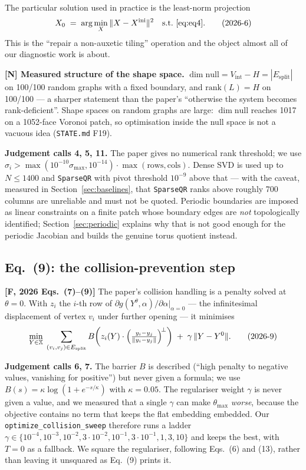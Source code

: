 \documentclass[11pt,a4paper]{article}
\theoremstyle{definition}
\newcommand{\Esplit}{E_{\mathrm{split}}}
\newcommand{\file}[1]{\texttt{\small #1}}
\begin{document}
The particular solution used in practice is the least-norm projection
\begin{equation}
X_0 \;=\; \arg\min_X \|X-X^{\mathrm{ini}}\|^2 \quad\text{s.t.\ \eqref{eq:eq4}} .
\tag{2026-6}
\label{eq:eq6}
\end{equation}
This is the ``repair a non-auxetic tiling'' operation and the object almost all of our
diagnostic work is about.

\textbf{[N] Measured structure of the shape space.} $\dim\mathrm{null} = V_{\mathrm{int}}-H
= |\Esplit|$ on 100/100 random graphs with a fixed boundary, and $\mathrm{rank}(L)=H$ on
100/100 --- a sharper statement than the paper's ``otherwise the system becomes
rank-deficient''. Shape spaces on random graphs are large: $\dim\mathrm{null}$ reaches 1017
on a 1052-face Voronoi patch, so optimisation inside the null space is not a vacuous idea
(\file{STATE.md} F19).

\textbf{Judgement calls 4, 5, 11.} The paper gives no numerical rank threshold; we use
$\sigma_i > \max(10^{-10}\sigma_{\max},10^{-14})\cdot\max(\text{rows},\text{cols})$. Dense
SVD is used up to $N\le1400$ and \file{SparseQR} with pivot threshold $10^{-9}$ above that
--- with the caveat, measured in Section~\ref{sec:baselines}, that \file{SparseQR} ranks
above roughly 700 columns are unreliable and must not be quoted. Periodic boundaries are
imposed as linear constraints on a finite patch whose boundary edges are \emph{not}
topologically identified; Section~\ref{sec:periodic} explains why that is not good enough
for the periodic Jacobian and builds the genuine torus quotient instead.

\subsection{Eq.~(9): the collision-prevention step}

\textbf{[F, 2026 Eqs.~(7)--(9)]} The paper's collision handling is a penalty solved at
$\theta=0$. With $z_i$ the $i$-th row of $\partial g(Y^\theta,\alpha)/\partial\alpha|_{\alpha=0}$
--- the infinitesimal displacement of vertex $v_i$ under further opening --- it minimises
\begin{equation}
\min_{Y\in\mathbb{X}} \;\sum_{(v_i,v_j)\in\Esplit}
B\!\left( z_i(Y)\cdot\Bigl(\tfrac{y_i-y_j}{\|y_i-y_j\|}\Bigr)^{\!\perp}\right)
\;+\;\gamma\,\|Y-Y^0\| .
\tag{2026-9}
\label{eq:eq9}
\end{equation}

\textbf{Judgement calls 6, 7.} The barrier $B$ is described (``high penalty to negative
values, vanishing for positive'') but never given a formula; we use
$B(s)=\kappa\log(1+e^{-s/\kappa})$ with $\kappa=0.05$. The regulariser weight $\gamma$ is
never given a value, and we measured that a single $\gamma$ can make $\theta_{\max}$
\emph{worse}, because the objective contains no term that keeps the flat embedding embedded.
Our \file{optimize\_collision\_sweep} therefore runs a ladder
$\gamma\in\{10^{-4},10^{-3},10^{-2},3\!\cdot\!10^{-2},10^{-1},3\!\cdot\!10^{-1},1,3,10\}$ and
keeps the best, with $T=0$ as a fallback. We square the regulariser, following Eqs.~(6) and
(13), rather than leaving it unsquared as Eq.~(9) prints it.
\end{document}
